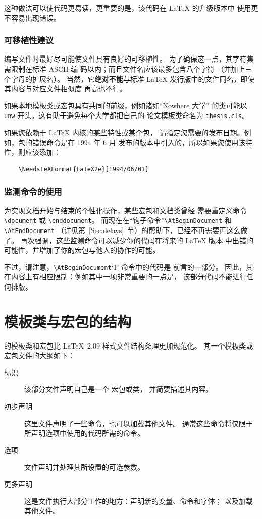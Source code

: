 \documentclass{ltxguide}[1995/11/28]
\begin{document}
这种做法可以使代码更易读，更重要的是，该代码在 \LaTeX{} 的升级版本中
使用更不容易出现错误。

\subsubsection{可移植性建议}

编写文件时最好尽可能使文件具有良好的可移植性。
为了确保这一点，其字符集需限制在标准 ASCII 编
码以内；而且文件名应该最多包含八个字符
（并加上三个字母的扩展名）。
当然，它\textbf{绝对不能}与标准 \LaTeX{}
发行版中的文件同名，即使其内容与对应文件相似度
再高也不行。

如果本地模板类或宏包具有共同的前缀，例如诸如“Nowhere 大学”
的类可能以 \verb|unw| 开头。这有助于避免每个大学都把自己的
论文模板类命名为 \verb|thesis.cls|。

如果您依赖于 \LaTeX{} 内核的某些特性或某个包，
请指定您需要的发布日期。例如，包的错误命令是在 1994 年 6 月
发布的版本中引入的，所以如果您使用该特性，则应该添加：
\begin{verbatim}
	\NeedsTeXFormat{LaTeX2e}[1994/06/01]
\end{verbatim}

\subsubsection{监测命令的使用}

为实现文档开始与结束的个性化操作，某些宏包和文档类曾经
需要重定义命令 \verb|\document| 或 \verb|\enddocument|。
而现在在“钩子命令”\verb|\AtBeginDocument| 和 \verb|\AtEndDocument|
（详见第~\ref{Sec:delays}~节）的帮助下，已经不再需要再这么做了。
再次强调，这些监测命令可以减少你的代码在将来的 \LaTeX{} 版本
中出错的可能性，并增加了你的宏包与他人的协作的可能。

不过，请注意，\verb|\AtBeginDocument|`1' 命令中的代码是
前言的一部分。
因此，其在内容上有相应限制：例如其中一项非常重要的一点是，
该部分代码不能进行任何排版。

\section{模板类与宏包的结构}
\label{Sec:structure}

\LaTeXe{} 的模板类和宏包比 \LaTeX~2.09 样式文件结构条理更加规范化。
其一个模板类或宏包文件的大纲如下：
\begin{description}
	\item[标识]
		该部分文件声明自己是一个 \LaTeXe{} 宏包或类，
		并简要描述其内容。
	\item[初步声明]
		这里文件声明了一些命令，也可以加载其他文件。
		通常这些命令将仅限于所声明选项中使用的代码所需的命令。
	\item[选项]
		文件声明并处理其所设置的可选参数。
	\item[更多声明]
		这是文件执行大部分工作的地方：声明新的变量、命令和字体；
		以及加载其他文件。
\end{description}
\end{document}
